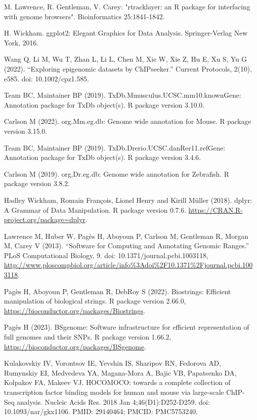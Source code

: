 \documentclass[12pt]{article}
\begin{document}
\begin{thebibliography}{99}
 M. Lawrence, R. Gentleman, V. Carey: "rtracklayer: an {R}
package for interfacing with genome browsers". Bioinformatics 25:1841-1842.

 H. Wickham. ggplot2: Elegant Graphics for Data Analysis.
Springer-Verlag New York, 2016.

 Wang Q, Li M, Wu T, Zhan L, Li L, Chen M, Xie W, Xie Z, Hu E,
Xu S, Yu G (2022). “Exploring epigenomic datasets by ChIPseeker.” Current
Protocols, 2(10), e585. doi: 10.1002/cpz1.585.

 Team BC, Maintainer BP (2019).
TxDb.Mmusculus.UCSC.mm10.knownGene: Annotation package for TxDb object(s).
R package version 3.10.0.

 Carlson M (2022). org.Mm.eg.db: Genome wide annotation for
Mouse. R package version 3.15.0.

 Team BC, Maintainer BP (2019).
TxDb.Drerio.UCSC.danRer11.refGene: Annotation package for TxDb object(s).
R package version 3.4.6.

 Carlson M (2019). org.Dr.eg.db: Genome wide annotation for
Zebrafish. R package version 3.8.2.

 Hadley Wickham, Romain François, Lionel Henry and Kirill Müller
(2018). dplyr: A Grammar of Data Manipulation. R package version 0.7.6.
\url{https://CRAN.R-project.org/package=dplyr}.

 Lawrence M, Huber W, Pagès H, Aboyoun P, Carlson M,
Gentleman R, Morgan M, Carey V (2013). “Software for Computing and Annotating
Genomic Ranges.” PLoS Computational Biology, 9.
doi: 10.1371/journal.pcbi.1003118,
\url{http://www.ploscompbiol.org/article/info%3Adoi%2F10.1371%2Fjournal.pcbi.1003118}.

 Pagès H, Aboyoun P, Gentleman R, DebRoy S (2022).
Biostrings: Efficient manipulation of biological strings. R package version
2.66.0, \url{https://bioconductor.org/packages/Biostrings}.

 Pagès H (2023). BSgenome: Software infrastructure for
efficient representation of full genomes and their SNPs. R package version
1.66.2, \url{https://bioconductor.org/packages/BSgenome}.

 Kulakovskiy IV, Vorontsov IE, Yevshin IS, Sharipov RN,
Fedorova AD, Rumynskiy EI, Medvedeva YA, Magana-Mora A, Bajic VB, Papatsenko DA,
Kolpakov FA, Makeev VJ. HOCOMOCO: towards a complete collection of transcription
factor binding models for human and mouse via large-scale ChIP-Seq analysis.
Nucleic Acids Res. 2018 Jan 4;46(D1):D252-D259. doi: 10.1093/nar/gkx1106.
PMID: 29140464; PMCID: PMC5753240.


\end{thebibliography}
\end{document}
